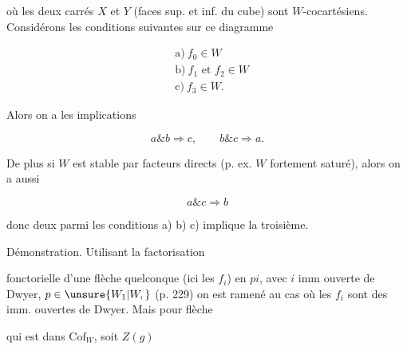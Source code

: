 où les deux carrés $X$ et $Y$ (faces sup. et inf. du cube) sont $W$-cocartésiens. Considérons les conditions suivantes sur ce diagramme

\[
\begin{aligned}
&\text{a)}\ f_0\in W\\
&\text{b)}\ f_1\text{ et }f_2\in W\\
&\text{c)}\ f_3\in W.
\end{aligned}
\]

Alors on a les implications

\[
a\mathbin{\&}b\Longrightarrow c,\qquad b\mathbin{\&}c\Longrightarrow a.
\]

De plus si $W$ est stable par facteurs directs (p. ex. $W$ fortement saturé), alors on a aussi

\[
a\mathbin{\&}c\Longrightarrow b
\]

donc  deux  parmi les conditions a) b) c) implique la troisième.

Démonstration. Utilisant la factorisation

fonctorielle d'une flèche quelconque (ici les $f_i$) en $pi$, avec $i$ imm ouverte de Dwyer, $p\in\unsure{W_1|W,}$ (p. 229) on est ramené au cas où les $f_i$ sont des imm. ouvertes de Dwyer.  Mais pour  flèche


 qui est dans $\mathrm{Cof}_W$, soit $Z(g)$  


